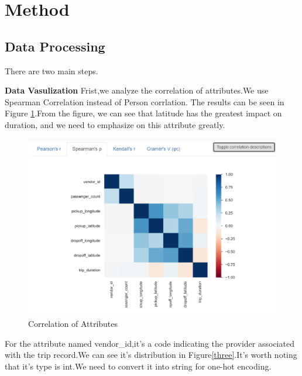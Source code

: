 %

\section{Method} \label{sec-method}

\subsection{Data Processing}
There are two main steps.
\par
\textbf{Data Vasulization} \quad Frist,we analyze the correlation of attributes.We use Spearman Correlation instead of Person corrlation.
The results can be seen in Figure \ref{two}.From the figure, we can see that latitude has the greatest impact on duration, and we need to emphasize on this attribute greatly.
\par
\begin{figure}[htbp]
	\centering
	\includegraphics[scale=0.4]{figures/two.eps}
	\caption{Correlation of Attributes} \label{two}
\end{figure}
\par For the attribute named vendor\_id,it's a code indicating the provider associated with the trip record.We can see it's distribution in Figure\ref{three}.It's worth noting that it's type is int.We need to convert it into string for one-hot encoding.
